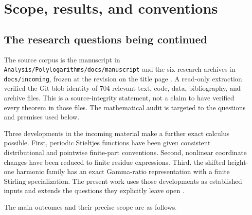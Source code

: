 \documentclass[11pt,a4paper]{article}
\theoremstyle{definition}
\theoremstyle{remark}
\numberwithin{equation}{section}
\begin{document}
\hypersetup{pageanchor=true}
{\small\tableofcontents}
\clearpage
{}
\section{Scope, results, and conventions}
\label{scope:sec}

\subsection{The research questions being continued}

The source corpus is the manuscript in
\texttt{Analysis/Polylogarithms/docs/manuscript} and the six research
archives in \texttt{docs/incoming}, frozen at the revision on the title
page \cite{Repo}. A read-only extraction verified the Git blob identity
of 704 relevant text, code, data, bibliography, and archive files.
This is a source-integrity statement, not a claim to have verified every
theorem in those files. The mathematical audit is targeted to the
questions and premises used below.

Three developments in the incoming material make a further exact
calculus possible. First, periodic Stieltjes functions have been given
consistent distributional and pointwise finite-part conventions.
Second, nonlinear coordinate changes have been reduced to finite
residue expressions. Third, the shifted height-one harmonic family
has an exact Gamma-ratio representation with a finite Stirling
specialization. The present work uses those developments as
established inputs and extends the questions they explicitly leave
open \cite{IncomingCoincident,IncomingTransport,IncomingExact}.

The main outcomes and their precise scope are as follows.
\end{document}

